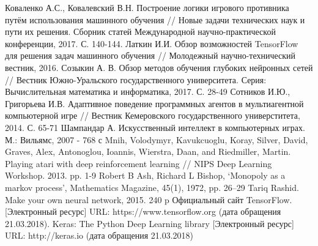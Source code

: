 \newpage
{}
\begin{thebibliography}{99}
 Коваленко А.С., Ковалевский В.Н. Построение логики игрового противника путём использования машинного обучения // Новые задачи технических наук и пути их решения. Сборник статей Международной научно-практической конференции, 2017.  С. 140-144.
 Латкин И.И. Обзор возможностей TensorFlow для решения задач машинного обучения // Молодежный научно-технический вестник, 2016. 
 Созыкин А. В. Обзор методов обучения глубоких нейронных сетей // Вестник Южно-Уральского государственного университета. Серия: Вычислительная математика и информатика, 2017. С. 28-49
 Сотников И.Ю., Григорьева И.В. Адаптивное поведение программных агентов в мультиагентной компьютерной игре // Вестник Кемеровского государственного универститета, 2014. С. 65-71
 Шампандар А. Искусственный интеллект в компьютерных играх. М.: Вильямс, 2007 - 768 с
 Mnih, Volodymyr, Kavukcuoglu, Koray, Silver, David, Graves, Alex, Antonoglou, Ioannis, Wierstra, Daan, and Riedmiller, Martin. Playing atari with deep reinforcement learning // NIPS Deep Learning Workshop. 2013. pp. 1-9
 Robert B Ash, Richard L Bishop, ‘Monopoly as a markov process’, Mathematics Magazine, 45(1), 1972, pp. 26–29
 Tariq Rashid. Make your own neural network, 2015. 240 p
 Официальный сайт TensorFlow. [Электронный ресурс] URL: https://www.tensorflow.org (дата обращения 21.03.2018).
 Keras: The Python Deep Learning library [Электронный ресурс] URL: http://keras.io (дата обращения 21.03.2018)
\end{thebibliography}